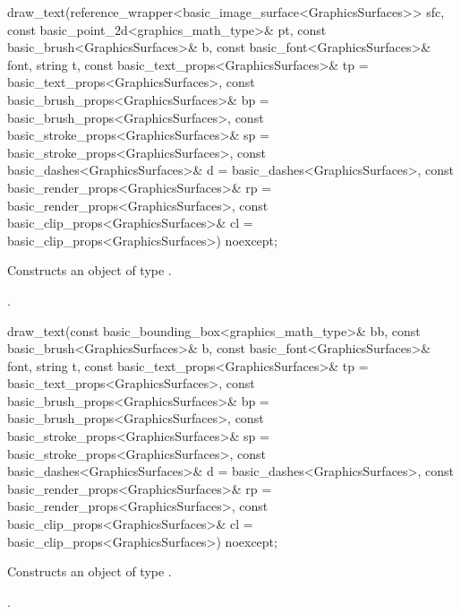 %
\begin{itemdecl}
draw_text(reference_wrapper<basic_image_surface<GraphicsSurfaces>> sfc,
  const basic_point_2d<graphics_math_type>& pt,
  const basic_brush<GraphicsSurfaces>& b,
  const basic_font<GraphicsSurfaces>& font, string t,
  const basic_text_props<GraphicsSurfaces>& tp = 
  basic_text_props<GraphicsSurfaces>{},
  const basic_brush_props<GraphicsSurfaces>& bp = 
  basic_brush_props<GraphicsSurfaces>{},
  const basic_stroke_props<GraphicsSurfaces>& sp = 
  basic_stroke_props<GraphicsSurfaces>{},
  const basic_dashes<GraphicsSurfaces>& d =
  basic_dashes<GraphicsSurfaces>{},
  const basic_render_props<GraphicsSurfaces>& rp = 
  basic_render_props<GraphicsSurfaces>{},
  const basic_clip_props<GraphicsSurfaces>& cl = 
  basic_clip_props<GraphicsSurfaces>{}) noexcept;
\end{itemdecl}
\begin{itemdescr}
\pnum
\effects Constructs an object of type .

\pnum
\postconditions {}.
\end{itemdescr}

%
\begin{itemdecl}
draw_text(const basic_bounding_box<graphics_math_type>& bb,
  const basic_brush<GraphicsSurfaces>& b,
  const basic_font<GraphicsSurfaces>& font, string t,
  const basic_text_props<GraphicsSurfaces>& tp = 
  basic_text_props<GraphicsSurfaces>{},
  const basic_brush_props<GraphicsSurfaces>& bp = 
  basic_brush_props<GraphicsSurfaces>{},
  const basic_stroke_props<GraphicsSurfaces>& sp = 
  basic_stroke_props<GraphicsSurfaces>{},
  const basic_dashes<GraphicsSurfaces>& d = 
  basic_dashes<GraphicsSurfaces>{},
  const basic_render_props<GraphicsSurfaces>& rp = 
  basic_render_props<GraphicsSurfaces>{},
  const basic_clip_props<GraphicsSurfaces>& cl = 
  basic_clip_props<GraphicsSurfaces>{}) noexcept;
\end{itemdecl}
\begin{itemdescr}
\pnum
\effects Constructs an object of type .

\pnum
\postconditions {}.
\end{itemdescr}

